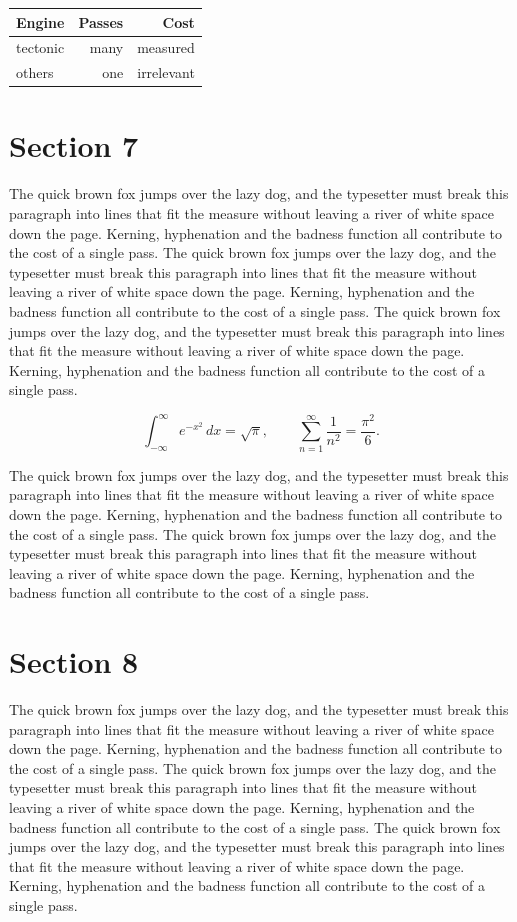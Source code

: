 \documentclass{article}
\begin{document}
\begin{center}
\begin{tabular}{lrr}
\toprule
Engine & Passes & Cost \\
\midrule
tectonic & many & measured \\
others & one & irrelevant \\
\bottomrule
\end{tabular}
\end{center}

\section{Section 7}
The quick brown fox jumps over the lazy dog, and the typesetter must break this paragraph into lines that fit the measure without leaving a river of white space down the page. Kerning, hyphenation and the badness function all contribute to the cost of a single pass. The quick brown fox jumps over the lazy dog, and the typesetter must break this paragraph into lines that fit the measure without leaving a river of white space down the page. Kerning, hyphenation and the badness function all contribute to the cost of a single pass. The quick brown fox jumps over the lazy dog, and the typesetter must break this paragraph into lines that fit the measure without leaving a river of white space down the page. Kerning, hyphenation and the badness function all contribute to the cost of a single pass. 

\begin{equation}
\int_{-\infty}^{\infty} e^{-x^{2}}\,dx = \sqrt{\pi}, \qquad
\sum_{n=1}^{\infty} \frac{1}{n^{2}} = \frac{\pi^{2}}{6}.
\end{equation}

The quick brown fox jumps over the lazy dog, and the typesetter must break this paragraph into lines that fit the measure without leaving a river of white space down the page. Kerning, hyphenation and the badness function all contribute to the cost of a single pass. The quick brown fox jumps over the lazy dog, and the typesetter must break this paragraph into lines that fit the measure without leaving a river of white space down the page. Kerning, hyphenation and the badness function all contribute to the cost of a single pass. 
\section{Section 8}
The quick brown fox jumps over the lazy dog, and the typesetter must break this paragraph into lines that fit the measure without leaving a river of white space down the page. Kerning, hyphenation and the badness function all contribute to the cost of a single pass. The quick brown fox jumps over the lazy dog, and the typesetter must break this paragraph into lines that fit the measure without leaving a river of white space down the page. Kerning, hyphenation and the badness function all contribute to the cost of a single pass. The quick brown fox jumps over the lazy dog, and the typesetter must break this paragraph into lines that fit the measure without leaving a river of white space down the page. Kerning, hyphenation and the badness function all contribute to the cost of a single pass. 
\end{document}
